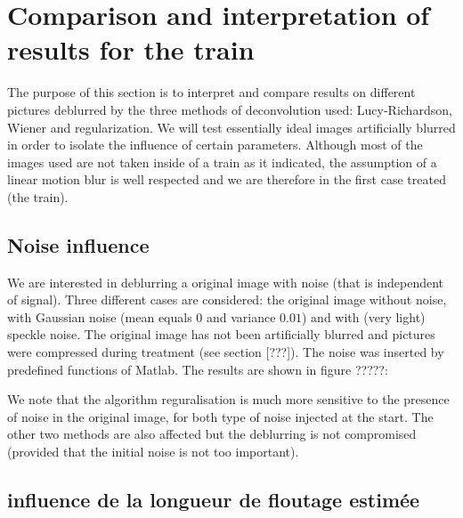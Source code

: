 
\section{Comparison and interpretation of results for the train}

The purpose of this section is to interpret and compare results on different pictures deblurred by the three methods of deconvolution used: Lucy-Richardson, Wiener and regularization. We will test essentially ideal images artificially blurred in order to isolate the influence of certain parameters. Although most of the images used are not taken inside of a train as it indicated, the assumption of a linear motion blur is well respected and we are therefore in the first case treated (the train).

\subsection{Noise influence}

We are interested in deblurring a original image with noise (that is independent of signal). Three different cases are considered: the original image without noise, with Gaussian noise (mean equals $0$ and variance $0.01$) and with (very light) speckle noise. The original image has not been artificially blurred and pictures were compressed during treatment (see section [???]). The noise was inserted by predefined functions of Matlab. The results are shown in figure ?????:


We note that the algorithm reguralisation is much more sensitive to the presence of noise in the original image, for both type of noise injected at the start. The other two methods are also affected but the deblurring is not compromised (provided that the initial noise is not too important).


\subsection{influence de la longueur de floutage estimée}

